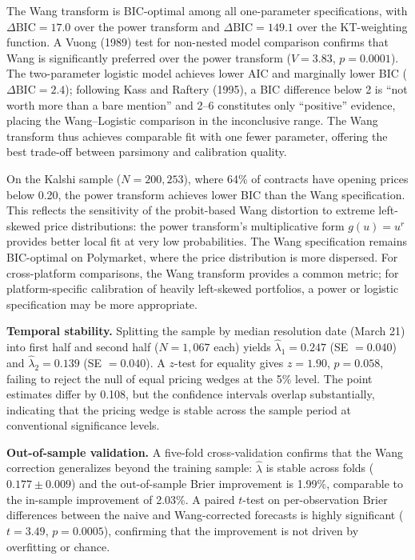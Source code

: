 \documentclass[12pt,a4paper]{article}
\begin{document}
The Wang transform is BIC-optimal among all one-parameter
specifications, with \(\Delta\text{BIC} = 17.0\) over the power
transform and \(\Delta\text{BIC} = 149.1\) over the KT-weighting
function. A Vuong (1989) test for non-nested model comparison confirms
that Wang is significantly preferred over the power transform
(\(V = 3.83\), \(p = 0.0001\)). The two-parameter logistic model
achieves lower AIC and marginally lower BIC
(\(\Delta\text{BIC} = 2.4\)); following Kass and Raftery (1995), a BIC
difference below 2 is ``not worth more than a bare mention'' and
2--6 constitutes only ``positive'' evidence, placing the Wang--Logistic
comparison in the inconclusive range. The Wang transform thus achieves comparable fit with one fewer
parameter, offering the best trade-off between parsimony and calibration
quality.

On the Kalshi sample (\(N = 200{,}253\)), where 64\% of contracts have
opening prices below 0.20, the power transform achieves lower BIC than
the Wang specification. This reflects the sensitivity of the
probit-based Wang distortion to extreme left-skewed price distributions:
the power transform's multiplicative form \(g(u) = u^r\) provides better
local fit at very low probabilities. The Wang specification remains
BIC-optimal on Polymarket, where the price distribution is more
dispersed. For cross-platform comparisons, the Wang transform provides a
common metric; for platform-specific calibration of heavily left-skewed
portfolios, a power or logistic specification may be more appropriate.

\textbf{Temporal stability.} Splitting the sample by median resolution
date (March 21) into first half and second half (\(N = 1{,}067\) each)
yields \(\hat{\lambda}_1 = 0.247\) (SE \(= 0.040\)) and
\(\hat{\lambda}_2 = 0.139\) (SE \(= 0.040\)). A \(z\)-test for equality
gives \(z = 1.90\), \(p = 0.058\), failing to reject the null of equal
pricing wedges at the 5\% level. The point estimates differ by 0.108,
but the confidence intervals overlap substantially, indicating that the
pricing wedge is stable across the sample period at conventional
significance levels.

\textbf{Out-of-sample validation.} A five-fold cross-validation confirms
that the Wang correction generalizes beyond the training sample:
\(\hat{\lambda}\) is stable across folds (\(0.177 \pm 0.009\)) and the
out-of-sample Brier improvement is 1.99\%, comparable to the in-sample
improvement of 2.03\%. A paired \(t\)-test on per-observation Brier
differences between the naive and Wang-corrected forecasts is highly
significant (\(t = 3.49\), \(p = 0.0005\)), confirming that the
improvement is not driven by overfitting or chance.
\end{document}
